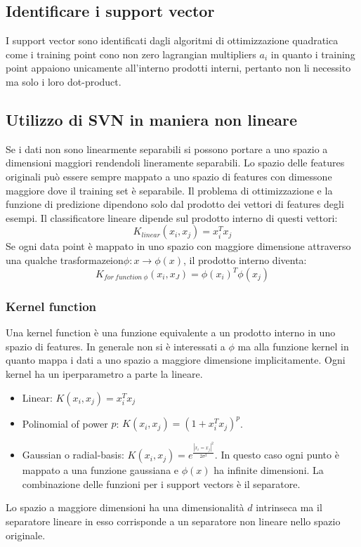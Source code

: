 	\subsection{Identificare i support vector}
	I support vector sono identificati dagli algoritmi di ottimizzazione quadratica come i training point cono non zero lagrangian multipliers $a_i$ in quanto i training point appaiono unicamente all'interno prodotti interni, pertanto non li necessito ma solo i loro dot-product.

	\subsection{Utilizzo di SVN in maniera non lineare}
	Se i dati non sono linearmente separabili si possono portare a uno spazio a dimensioni maggiori rendendoli lineramente separabili.
	Lo spazio delle features originali pu\`o essere sempre mappato a uno spazio di features con dimessone maggiore dove il training set \`e separabile.
	Il problema di ottimizzazione e la funzione di predizione dipendono solo dal prodotto dei vettori di features degli esempi.
	Il classificatore lineare dipende sul prodotto interno di questi vettori:
	$$K_{linear}(x_i,x_j) = x_i^Tx_j$$
	Se ogni data point \`e mappato in uno spazio con maggiore dimensione attraverso una qualche trasformazeion$\phi:x\rightarrow\phi(x)$, il prodotto interno diventa:
	$$K_{for\ function\ \phi}(x_i,x_J)= \phi(x_i)^T\phi(x_j)$$

		\subsubsection{Kernel function}
		Una kernel function \`e una funzione equivalente a un prodotto interno in uno spazio di features.
		In generale non si \`e interessati a $\phi$ ma alla funzione kernel in quanto mappa i dati a uno spazio a maggiore dimensione implicitamente.
		Ogni kernel ha un iperparametro a parte la lineare.
		\begin{itemize}
			\item Linear: $K(x_i,x_j) = x_i^Tx_j$
			\item Polinomial of power $p$: $K(x_i, x_j) = (1+x_i^Tx_j)^p$.
			\item Gaussian o radial-basis: $K(x_i, x_j) = e^{\frac{|x_i = x_j|^2}{2\sigma^2}}$.
				In questo caso ogni punto \`e mappato a una funzione gaussiana e $\phi(x)$ ha infinite dimensioni.
				La combinazione delle funzioni per i support vectors \`e il separatore.
		\end{itemize}
		Lo spazio a maggiore dimensioni ha una dimensionalit\`a $d$ intrinseca ma il separatore lineare in esso corrisponde a un separatore non lineare nello spazio originale.

